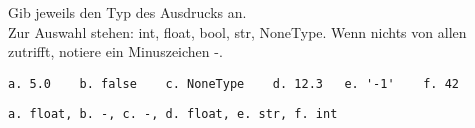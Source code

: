 \question[3]
Gib jeweils den Typ des Ausdrucks an. \\
Zur Auswahl stehen: int, float, bool, str, NoneType. Wenn nichts von allen zutrifft, notiere
ein Minuszeichen -.
\begin{lstlisting}
a. 5.0    b. false    c. NoneType    d. 12.3   e. '-1'    f. 42
\end{lstlisting}
\begin{solutionbox}{2cm}
\begin{lstlisting}
a. float, b. -, c. -, d. float, e. str, f. int
\end{lstlisting}
\end{solutionbox}
